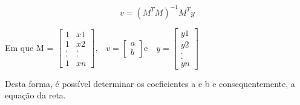 	\begin{equation}
		v =( M^{T}M)^{-1}M^{T}y
	\label{minquad}
	\end{equation}

	Em que 
	M = $\left[\begin{array}{cc}
               	1 & x1 \\
               	1 & x2  \\
		. & .  \\
               	. & .  \\
		1 & xn
          	         \end{array}\right] \mbox{,} \quad
	v = \left[\begin{array}{c}
               	a \\
               	b  
          	         \end{array}\right] \mbox{e} \quad
	y = \left[\begin{array}{c}
               	y1 \\
               	y2  \\
		.   \\
               	.   \\
		yn
          	         \end{array}\right] $

	Desta forma, é possível determinar os coeficientes a e b e consequentemente, a equação da reta. 
